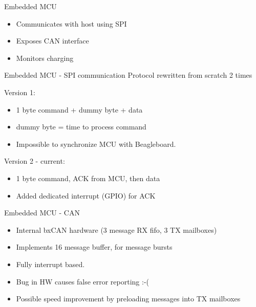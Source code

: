 \documentclass{beamer}
\begin{document}
\begin{frame}{Embedded MCU}

\begin{itemize}
	\item Communicates with host using SPI
	\item Exposes CAN interface
	\item Monitors charging
\end{itemize}

\end{frame}

\begin{frame}{Embedded MCU - SPI communication}
Protocol rewritten from scratch 2 times

Version 1:
\begin{itemize}
	\item 1 byte command + dummy byte + data
	\item dummy byte = time to process command
	\item Impossible to synchronize MCU with Beagleboard.
\end{itemize}

Version 2 - current:
\begin{itemize}
\item 1 byte command, ACK from MCU, then data
\item Added dedicated interrupt (GPIO) for ACK
\end{itemize}
\end{frame}

\begin{frame}{Embedded MCU - CAN}
\begin{itemize}
	\item Internal bxCAN hardware (3 message RX fifo, 3 TX mailboxes)
	\item Implements 16 message buffer, for message bursts 
	\item Fully interrupt based.
\end{itemize}

\begin{itemize}
\item Bug in HW causes false error reporting :-(
\item Possible speed improvement by preloading messages into TX mailboxes 
\end{itemize}
\end{frame}
\end{document}
